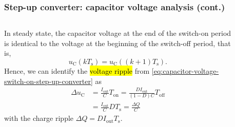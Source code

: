 \begin{frame}
    \frametitle{Step-up converter: capacitor voltage analysis (cont.)}
    \begin{columns}
        \begin{column}{0.5\textwidth}
            In steady state, the capacitor voltage at the end of the switch-on period is identical to the voltage at the beginning of the switch-off period, that is,
            \begin{equation*}
                    u_\mathrm{C}(kT_\mathrm{s}) = u_\mathrm{C}((k+1)T_\mathrm{s}).
            \end{equation*}
            Hence, we can identify the \hl{voltage ripple} from \eqref{eq:capacitor-voltage-switch-on-step-up-converter} as
            \begin{equation}
                \begin{split}
                    \Delta u_\mathrm{C}&=\frac{I_\mathrm{out}}{C}T_\mathrm{on} = \frac{DI_\mathrm{out}}{(1-D)C}T_\mathrm{off}\\
                                       &=\frac{I_\mathrm{out}}{C}DT_\mathrm{s}=\frac{\Delta Q}{C} 
                \end{split}
            \end{equation}
            with the charge ripple $\Delta Q = DI_\mathrm{out}T_\mathrm{s}$.
        \end{column}
        \begin{column}{0.5\textwidth}
            \begin{figure}
\end{figure}
\end{column}
\end{columns}
\end{frame}
